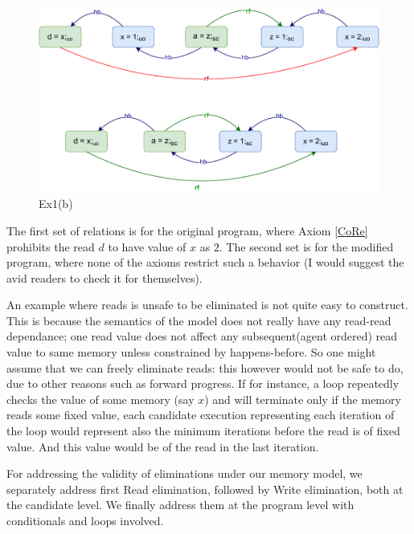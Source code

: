     \begin{figure}[H]
        \centering
        \includegraphics[scale=0.7]{Elimination/EliminationExample1(b).pdf}
        \caption{Ex1(b)} 
    \end{figure}


    The first set of relations is for the original program, where Axiom \ref{CoRe} prohibits the read $d$ to have value of $x$ as $2$.
    The second set is for the modified program, where none of the axioms restrict such a behavior (I would suggest the avid readers to check it for themselves).
    
    An example where reads is unsafe to be eliminated is not quite easy to construct.
    This is because the semantics of the model does not really have any read-read dependance; one read value does not affect any subsequent(agent ordered) read value to same memory unless constrained by happens-before.
    So one might assume that we can freely eliminate reads: this however would not be safe to do, due to other reasons such as forward progress.
    If for instance, a loop repeatedly checks the value of some memory (say $x$) and will terminate only if the memory reads some fixed value, each candidate execution representing each iteration of the loop would represent also the minimum iterations before the read is of fixed value. 
    And this value would be of the read in the last iteration. 

    For addressing the validity of eliminations under our memory model, we separately address first Read elimination, followed by Write elimination, both at the candidate level. 
    We finally address them at the program level with conditionals and loops involved. 
